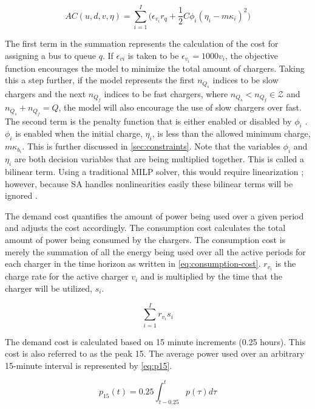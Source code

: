 \documentclass[ee,msthesis]{usuthesis}
\newcommand{\AC}{AC(u, d, v, \eta)}            %
\begin{document}
\begin{equation}
\label{eq:ac}
\AC = \sum_{i=1}^I \Big(\epsilon_{v_i}r_q + \frac{1}{2} C \phi_i (\eta_i - m \kappa_i)^{2}\Big)
\end{equation}

The first term in the summation represents the calculation of the cost for assigning a bus to queue \(q\). If \(\epsilon_{vi}\) is
taken to be \(\epsilon_{v_i} = 1000v_i\), the objective function encourages the model to minimize the total amount of chargers.
Taking this a step further, if the model represents the first \(n_{Q_s}\) indices to be slow chargers and the next
\(n_{Q_f}\) indices to be fast chargers, where \(n_{Q_s} < n_{Q_f} \in \mathcal{Z}\) and \(n_{Q_s} + n_{Q_f} = Q\), the model will also encourage the use of slow
chargers over fast. The second term is the penalty function that is either enabled or disabled by \(\phi_i\)
\cite{luenberger-2008-penal-barrier-method}. \(\phi_i\) is enabled when the initial charge, \(\eta_i\), is less than the allowed
minimum charge, \(m\kappa_{b_i}\). This is further discussed in \ref{sec:constraints}. Note that the variables \(\phi_i\) and \(\eta_i\) are
both decision variables that are being multiplied together. This is called a bilinear term. Using a traditional MILP
solver, this would require linearization \cite{rodriguez-2013-compar-asses}; however, because SA handles nonlinearities
easily these bilinear terms will be ignored \cite{radosavljevic-2018-metah-optim}.

The demand cost quantifies the amount of power being used over a given period and adjusts the cost accordingly. The
consumption cost calculates the total amount of power being consumed by the chargers. The consumption cost is merely the
summation of all the energy being used over all the active periods for each charger in the time horizon as written in
\ref{eq:consumption-cost}. \(r_{v_i}\) is the charge rate for the active charger \(v_i\) and is multiplied by the time that the
charger will be utilized, \(s_i\).

\begin{equation}
\label{eq:consumption-cost}
  \sum_{i=1}^I r_{v_i}s_i
\end{equation}

The demand cost is calculated based on 15 minute increments (0.25 hours). This cost is also referred to as the peak 15. The
average power used over an arbitrary 15-minute interval is represented by \ref{eq:p15}.

\begin{equation}
\label{eq:p15}
p_{15}(t) = 0.25 \int_{t-0.25}^{t} p(\tau) d\tau
\end{equation}
\end{document}
